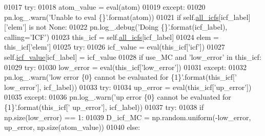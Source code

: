 \begin{DoxyCode}
{{{01017                 \textcolor{keywordflow}{try}:
01018                     atom\_value = eval(atom)
01019                 \textcolor{keywordflow}{except}:
01020                     pn.log\_.warn(\textcolor{stringliteral}{'Unable to eval \{\}'}.format(atom))
01021                 \textcolor{keywordflow}{if} self.\hyperlink{classpyneb_1_1core_1_1icf_1_1_i_c_f_a854ee87a53feb102e429e902227ce88b}{all\_icfs}[icf\_label][\textcolor{stringliteral}{'elem'}] \textcolor{keywordflow}{is} \textcolor{keywordflow}{not} \textcolor{keywordtype}{None}:
01022                     pn.log\_.debug(\textcolor{stringliteral}{'Doing \{\}'}.format(icf\_label), calling=\textcolor{stringliteral}{'ICF'})
01023                     this\_icf = self.\hyperlink{classpyneb_1_1core_1_1icf_1_1_i_c_f_a854ee87a53feb102e429e902227ce88b}{all\_icfs}[icf\_label]
01024                     elem = this\_icf[\textcolor{stringliteral}{'elem'}]
01025                     \textcolor{keywordflow}{try}:
01026                         icf\_value = eval(this\_icf[\textcolor{stringliteral}{'icf'}])
01027                         self.\hyperlink{classpyneb_1_1core_1_1icf_1_1_i_c_f_a9dedc0eb2ad90ea08b8be9984e2d832b}{icf\_value}[icf\_label] = icf\_value
01028                         \textcolor{keywordflow}{if} use\_MC \textcolor{keywordflow}{and} \textcolor{stringliteral}{'low\_error'} \textcolor{keywordflow}{in} this\_icf:
01029                             \textcolor{keywordflow}{try}:
01030                                 low\_error = eval(this\_icf[\textcolor{stringliteral}{'low\_error'}])
01031                             \textcolor{keywordflow}{except}:
01032                                 pn.log\_.warn(\textcolor{stringliteral}{'low error \{0\} cannot be evaluated for \{1\}'}.format(this\_icf[\textcolor{stringliteral}{'
      low\_error'}], icf\_label))
01033                             \textcolor{keywordflow}{try}:
01034                                 up\_error = eval(this\_icf[\textcolor{stringliteral}{'up\_error'}])
01035                             \textcolor{keywordflow}{except}:
01036                                 pn.log\_.warn(\textcolor{stringliteral}{'up error \{0\} cannot be evaluated for \{1\}'}.format(this\_icf[\textcolor{stringliteral}{'
      up\_error'}], icf\_label))
01037                             \textcolor{keywordflow}{try}:
01038                                 \textcolor{keywordflow}{if} np.size(low\_error) == 1:
01039                                     D\_icf\_MC = np.random.uniform(-low\_error, up\_error, np.size(atom\_value))
01040                                 \textcolor{keywordflow}{else}:
}}}
\end{DoxyCode}

